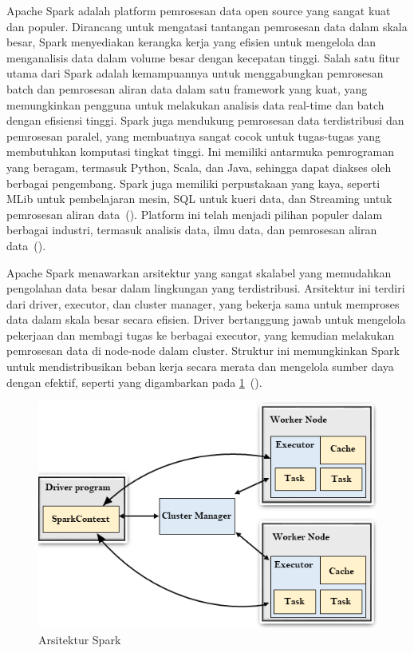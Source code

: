 Apache Spark adalah platform pemrosesan data open source yang
sangat kuat dan populer. Dirancang untuk mengatasi tantangan
pemrosesan data dalam skala besar, Spark menyediakan kerangka
kerja yang efisien untuk mengelola dan menganalisis data dalam
volume besar dengan kecepatan tinggi. Salah satu fitur utama
dari Spark adalah kemampuannya untuk menggabungkan pemrosesan
batch dan pemrosesan aliran data dalam satu framework yang
kuat, yang memungkinkan pengguna untuk melakukan analisis data
real-time dan batch dengan efisiensi tinggi. Spark juga mendukung
pemrosesan data terdistribusi dan pemrosesan paralel, yang
membuatnya sangat cocok untuk tugas-tugas yang membutuhkan
komputasi tingkat tinggi. Ini memiliki antarmuka pemrograman
yang beragam, termasuk Python, Scala, dan Java, sehingga dapat
diakses oleh berbagai pengembang. Spark juga memiliki perpustakaan
yang kaya, seperti MLib untuk pembelajaran mesin, SQL untuk kueri
data, dan Streaming untuk pemrosesan aliran data~(\cite{spark}).
Platform ini telah menjadi pilihan populer dalam berbagai
industri, termasuk analisis data, ilmu data, dan pemrosesan
aliran data~(\cite{shaikh2019}).

Apache Spark menawarkan arsitektur yang sangat skalabel yang memudahkan pengolahan data besar dalam lingkungan yang terdistribusi. Arsitektur ini terdiri dari driver, executor, dan cluster manager, yang bekerja sama untuk memproses data dalam skala besar secara efisien. Driver bertanggung jawab untuk mengelola pekerjaan dan membagi tugas ke berbagai executor, yang kemudian melakukan pemrosesan data di node-node dalam cluster. Struktur ini memungkinkan Spark untuk mendistribusikan beban kerja secara merata dan mengelola sumber daya dengan efektif, 
seperti yang digambarkan pada \ref{fig:sparkArsitektur}~(\cite{spark}).

\begin{figure}[H]
  \centering
  \includegraphics[scale=0.5]{gambar/sparkArsitektur.png}
  \caption{Arsitektur Spark}
  \label{fig:sparkArsitektur}
\end{figure}

